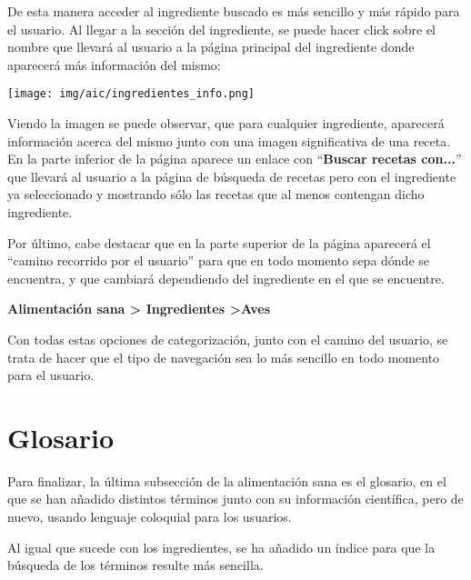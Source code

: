 \documentclass{\ClassPath/viu-tfm-template}
\begin{document}
De esta manera acceder al ingrediente buscado es más sencillo y más rápido para el usuario. Al llegar a la sección del ingrediente, se puede hacer click sobre el nombre que llevará al usuario a la página principal del ingrediente donde aparecerá más información del mismo:

\begin{center}
    \vspace{-10pt}
    \texttt{[image: img/aic/ingredientes\_info.png]}
    \vspace{-20pt}
\end{center}

Viendo la imagen se puede observar, que para cualquier ingrediente, aparecerá información acerca del mismo junto con una imagen significativa de una receta. En la parte inferior de la página aparece un enlace con “\textbf{{\color{maincolor}Buscar recetas con...}}” que llevará al usuario a la página de búsqueda de recetas pero con el ingrediente ya seleccionado y mostrando sólo las recetas que al menos contengan dicho ingrediente.

Por último, cabe destacar que en la parte superior de la página aparecerá el “camino recorrido por el usuario” para que en todo momento sepa dónde se encuentra, y que cambiará dependiendo del ingrediente en el que se encuentre.

\begin{center}
    \vspace{-10pt}
    \textbf{{\color{maincolor}Alimentación sana > \space Ingredientes} >\space Aves}
    \vspace{-15pt}
\end{center}

Con todas estas opciones de categorización, junto con el camino del usuario, se trata de hacer que el tipo de navegación sea lo más sencillo en todo momento para el usuario.


\section{Glosario}
Para finalizar, la última subsección de la alimentación sana es el glosario, en el que se han añadido distintos términos junto con su información científica, pero de nuevo, usando lenguaje coloquial para los usuarios.

Al igual que sucede con los ingredientes, se ha añadido un índice para que la búsqueda de los términos resulte más sencilla.
\end{document}
